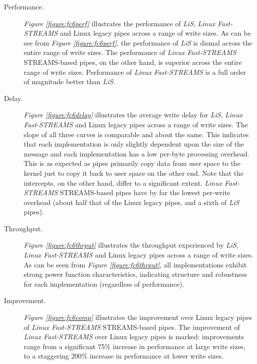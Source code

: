 \documentclass[letterpaper,final,notitlepage,twocolumn,10pt,twoside]{article}
\begin{document}
\begin{description}

\item[Performance.]

\textit{Figure \ref{figure:fc6perf}}
illustrates the performance of \textsl{LiS}, \textsl{Linux Fast-STREAMS} and Linux legacy pipes
across a range of write sizes.  As can be see from \textit{Figure \ref{figure:fc6perf}}, the
performance of \textsl{LiS} is dismal across the entire range of write sizes.  The performance of
\textsl{Linux Fast-STREAMS} STREAMS-based pipes, on the other hand, is superior across the entire
range of write sizes.  Performance of \textsl{Linux Fast-STREAMS} is a full order of magnitude
better than \textsl{LiS}.

\item[Delay.]

\textit{Figure \ref{figure:fc6delay}}
illustrates the average write delay for \textsl{LiS}, \textsl{Linux Fast-STREAMS} and Linux legacy
pipes across a range of write sizes.  The slope of all three curves is comparable and about the
same.  This indicates that each implementation is only slightly dependent upon the size of the
message and each implementation has a low per-byte processing overhead.  This is as expected as
pipes primarily copy data from user space to the kernel just to copy it back to user space on the
other end.  Note that the intercepts, on the other hand, differ to a significant extent.
\textsl{Linux Fast-STREAMS} STREAMS-based pipes have by far the lowest per-write overhead (about
half that of the Linux legacy pipes, and a sixth of \textsl{LiS} pipes).

\item[Throughput.]

\textit{Figure \ref{figure:fc6thrput}}
illustrates the throughput experienced by \textsl{LiS}, \textsl{Linux Fast-STREAMS} and Linux legacy
pipes across a range of write sizes.  As can be seen from \textit{Figure \ref{figure:fc6thrput}},
all implementations exhibit strong power function characteristics, indicating structure and
robustness for each implementation (regardless of performance).

\item[Improvement.]

\textit{Figure \ref{figure:fc6comp}}
illustrates the improvement over Linux legacy pipes of \textsl{Linux Fast-STREAMS} STREAMS-based
pipes.  The improvement of \textsl{Linux Fast-STREAMS} over Linux legacy pipes is marked:
improvements range from a significant 75\% increase in performance at large write sizes, to a
staggering 200\% increase in performance at lower write sizes.

\end{description}
\end{document}
